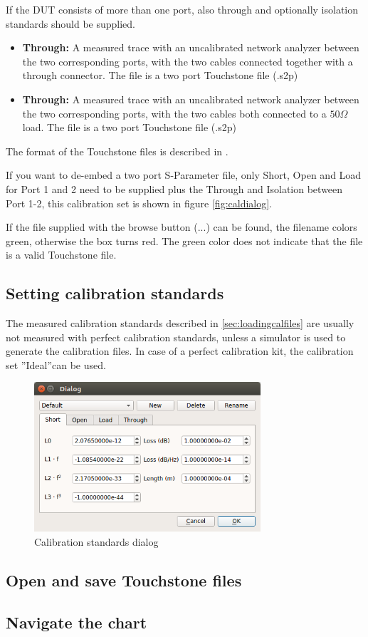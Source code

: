 If the DUT consists of more than one port, also through and optionally isolation standards should be supplied. 
\begin{itemize}
	\item {\textbf{Through:} A measured trace with an uncalibrated network analyzer between the two corresponding ports, with the two cables connected together with a through connector. The file is a two port Touchstone file (.s2p)}
	\item {\textbf{Through:} A measured trace with an uncalibrated network analyzer between the two corresponding ports, with the two cables both connected to a $50\Omega$ load. The file is a two port Touchstone file (.s2p)}
\end{itemize}
The format of the Touchstone files is described in \cite{touchstoneformat}.

If you want to de-embed a two port S-Parameter file, only Short, Open and Load for Port 1 and 2 need to be supplied plus the Through and Isolation between Port 1-2, this calibration set is shown in figure \ref{fig:caldialog}.

If the file supplied with the browse button (...) can be found, the filename colors green, otherwise the box turns red. The green color does not indicate that the file is a valid Touchstone file.

\subsection{Setting calibration standards}
\label{sec:settingcalstds}

The measured calibration standards described in \ref{sec:loadingcalfiles} are usually not measured with perfect calibration standards, unless a simulator is used to generate the calibration files. In case of a perfect calibration kit, the calibration set ''Ideal''can be used.

\begin{figure}[H]
	\centering
	\includegraphics[width=0.75\textwidth]{figures/screenshot4.png}
	\caption{Calibration standards dialog}
	\label{fig:calstddialog}
\end{figure}
\subsection{Open and save Touchstone files}
\subsection{Navigate the chart}
\newpage
